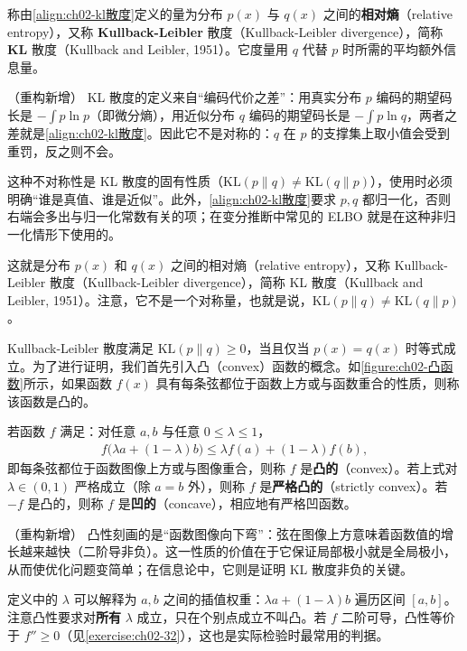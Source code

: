 \documentclass[../../main.tex]{subfiles}
\begin{document}
\begin{definition}\label{definition:ch02-kl散度}
称由\eqref{align:ch02-kl散度}定义的量为分布 $p(x)$ 与 $q(x)$ 之间的\textbf{相对熵}（relative entropy），又称 \textbf{Kullback-Leibler} 散度（Kullback-Leibler divergence），简称 \textbf{KL} 散度（Kullback and Leibler, 1951）。它度量用 $q$ 代替 $p$ 时所需的平均额外信息量。
\end{definition}

\begin{remark}（重构新增）
KL 散度的定义来自“编码代价之差”：用真实分布 $p$ 编码的期望码长是 $-\int p\ln p$（即微分熵），用近似分布 $q$ 编码的期望码长是 $-\int p\ln q$，两者之差就是\eqref{align:ch02-kl散度}。因此它不是对称的：$q$ 在 $p$ 的支撑集上取小值会受到重罚，反之则不会。

这种不对称性是 KL 散度的固有性质（$\mathrm{KL}(p\|q)\neq\mathrm{KL}(q\|p)$），使用时必须明确“谁是真值、谁是近似”。此外，\eqref{align:ch02-kl散度}要求 $p,q$ 都归一化，否则右端会多出与归一化常数有关的项；在变分推断中常见的 ELBO 就是在这种非归一化情形下使用的。
\end{remark}

这就是分布 $p(x)$ 和 $q(x)$ 之间的相对熵（relative entropy），又称 Kullback-Leibler 散度（Kullback-Leibler divergence），简称 KL 散度（Kullback and Leibler, 1951）。注意，它不是一个对称量，也就是说，$\mathrm{KL}(p\|q)\neq\mathrm{KL}(q\|p)$。

Kullback-Leibler 散度满足 $\mathrm{KL}(p\|q)\geqslant0$，当且仅当 $p(x)=q(x)$ 时等式成立。为了进行证明，我们首先引入凸（convex）函数的概念。如\cref{figure:ch02-凸函数}所示，如果函数 $f(x)$ 具有每条弦都位于函数上方或与函数重合的性质，则称该函数是凸的。

\begin{definition}[凸函数与凹函数]\label{definition:ch02-凸函数}
若函数 $f$ 满足：对任意 $a,b$ 与任意 $0\leqslant\lambda\leqslant1$，
\begin{align*}
  f\big(\lambda a+(1-\lambda)b\big) \leqslant \lambda f(a)+(1-\lambda)f(b) ,
\end{align*}
即每条弦都位于函数图像上方或与图像重合，则称 $f$ 是\textbf{凸的}（convex）。若上式对 $\lambda\in(0,1)$ 严格成立（除 $a=b$ 外），则称 $f$ 是\textbf{严格凸的}（strictly convex）。若 $-f$ 是凸的，则称 $f$ 是\textbf{凹的}（concave），相应地有严格凹函数。
\end{definition}

\begin{remark}（重构新增）
凸性刻画的是“函数图像向下弯”：弦在图像上方意味着函数值的增长越来越快（二阶导非负）。这一性质的价值在于它保证局部极小就是全局极小，从而使优化问题变简单；在信息论中，它则是证明 KL 散度非负的关键。

定义中的 $\lambda$ 可以解释为 $a,b$ 之间的插值权重：$\lambda a+(1-\lambda)b$ 遍历区间 $[a,b]$。注意凸性要求对\textbf{所有} $\lambda$ 成立，只在个别点成立不叫凸。若 $f$ 二阶可导，凸性等价于 $f''\geqslant0$（见\cref{exercise:ch02-32}），这也是实际检验时最常用的判据。
\end{remark}
\end{document}
